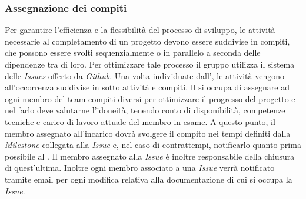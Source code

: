 	\subsubsection{Assegnazione dei compiti}
	Per garantire l'efficienza e la flessibilità del processo di sviluppo, le attività necessarie al completamento di un progetto devono essere suddivise in compiti, che possono essere svolti sequenzialmente o in parallelo a seconda delle dipendenze tra di loro. Per ottimizzare tale processo il gruppo utilizza il sistema delle \emph{Issues} offerto da \emph{Github}.	
	Una volta individuate dall'\Ana{}, le attività vengono all'occorrenza suddivise in sotto attività e compiti. Il \RdP{} si occupa di assegnare ad ogni membro del team compiti diversi per ottimizzare il progresso del progetto e nel farlo deve valutarne l'idoneità, tenendo conto di disponibilità, competenze tecniche e carico di lavoro attuale del membro in esame. A questo punto, il membro assegnato all'incarico dovrà svolgere il compito nei tempi definiti dalla \emph{Milestone} collegata alla \emph{Issue} e, nel caso di contrattempi, notificarlo quanto prima possibile al \RdP{}. Il membro assegnato alla \emph{Issue} è inoltre responsabile della chiusura di quest'ultima. Inoltre ogni membro associato a una \emph{Issue} verrà notificato tramite email per ogni modifica relativa alla documentazione %
	di cui si occupa la \emph{Issue}.